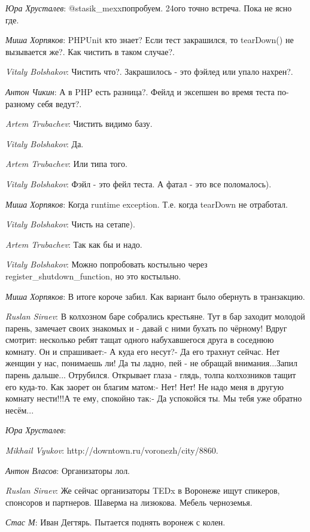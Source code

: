 \documentclass[10pt]{book}
\newcommand{\AUTHOR}[1]{\emph{#1}:}
\begin{document}
\AUTHOR{Юра Хрусталев} @stasik_mexxпопробуем. 24ого точно встреча. Пока не ясно где.

\AUTHOR{Миша Хорпяков} PHPUnit кто знает? Если тест закрашился, то tearDown() не вызывается же?. Как чистить в таком случае?.

\AUTHOR{Vitaly Bolshakov} Чистить что?. Закрашилось - это фэйлед или упало нахрен?.

\AUTHOR{Антон Чикин} А в PHP есть разница?. Фейлд и эксепшен во время теста по-разному себя ведут?.

\AUTHOR{Artem Trubachev} Чистить видимо базу.

\AUTHOR{Vitaly Bolshakov} Да.

\AUTHOR{Artem Trubachev} Или типа того.

\AUTHOR{Vitaly Bolshakov} Фэйл - это фейл теста. А фатал  - это все поломалось).

\AUTHOR{Миша Хорпяков} Когда runtime exception. Т.е. когда tearDown не отработал.

\AUTHOR{Vitaly Bolshakov} Чисть на сетапе).

\AUTHOR{Artem Trubachev} Так как бы и надо.

\AUTHOR{Vitaly Bolshakov} Можно попробовать костыльно через register_shutdown_function, но это костыльно.

\AUTHOR{Миша Хорпяков} В итоге короче забил. Как вариант было обернуть в транзакцию.

\AUTHOR{Ruslan Siraev} В колхозном баре собрались крестьяне. Тут в бар заходит молодой парень, замечает своих знакомых и - давай с ними бухать по чёрному! Вдруг смотрит: несколько ребят тащат одного набухавшегося друга в соседнюю комнату. Он и спрашивает:- А куда его несут?- Да его трахнут сейчас. Нет женщин у нас, понимаешь ли! Да ты ладно, пей - не обращай внимания...Запил парень дальше... Отрубился. Открывает глаза - глядь, толпа колхозников тащит его куда-то. Как заорет он благим матом:- Нет! Нет! Не надо меня в другую комнату нести!!!А те ему, спокойно так:- Да успокойся ты. Мы тебя уже обратно несём...

\AUTHOR{Юра Хрусталев}

\AUTHOR{Mikhail Vyukov} http://downtown.ru/voronezh/city/8860.

\AUTHOR{Антон Власов} Организаторы лол.

\AUTHOR{Ruslan Siraev} Же сейчас организаторы TEDx в Воронеже ищут спикеров, спонсоров и партнеров. Шаверма на лизюкова. Мебель черноземья.

\AUTHOR{Стас М} Иван Дегтярь. Пытается поднять воронеж с колен.
\end{document}

